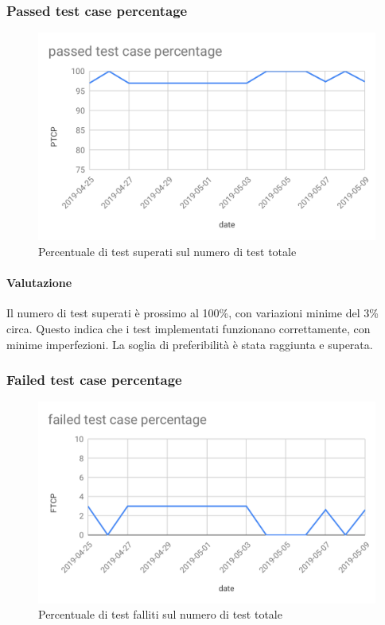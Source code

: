 \subsubsection{Passed test case percentage}
\begin{figure}[H]
	\centering
	\includegraphics[scale=0.7]{res/images/RA/ptcp.pdf}
	\caption{Percentuale di test superati sul numero di test totale}
\end{figure}
\paragraph*{Valutazione}
Il numero di test superati è prossimo al 100\%, con variazioni minime del 3\% circa. Questo indica che i test implementati funzionano correttamente, con minime imperfezioni. La soglia di preferibilità è stata raggiunta e superata.

\subsubsection{Failed test case percentage}
\begin{figure}[H]
	\centering
	\includegraphics[scale=0.7]{res/images/RA/ftcp.pdf}
	\caption{Percentuale di test falliti sul numero di test totale}
\end{figure}
